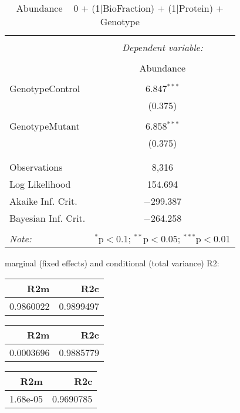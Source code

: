 \documentclass[11pt]{report}
\begin{document}
\begin{table}[!htbp] \centering 
  \caption{Abundance ~ 0 + (1|BioFraction) + (1|Protein) + Genotype} 
  \label{} 
\begin{tabular}{@{\extracolsep{5pt}}lc} 
\\[-1.8ex]\hline 
\hline \\[-1.8ex] 
 & \multicolumn{1}{c}{\textit{Dependent variable:}} \\ 
\cline{2-2} 
\\[-1.8ex] & Abundance \\ 
\hline \\[-1.8ex] 
 GenotypeControl & 6.847$^{***}$ \\ 
  & (0.375) \\ 
  & \\ 
 GenotypeMutant & 6.858$^{***}$ \\ 
  & (0.375) \\ 
  & \\ 
\hline \\[-1.8ex] 
Observations & 8,316 \\ 
Log Likelihood & 154.694 \\ 
Akaike Inf. Crit. & $-$299.387 \\ 
Bayesian Inf. Crit. & $-$264.258 \\ 
\hline 
\hline \\[-1.8ex] 
\textit{Note:}  & \multicolumn{1}{r}{$^{*}$p$<$0.1; $^{**}$p$<$0.05; $^{***}$p$<$0.01} \\ 
\end{tabular} 
\end{table} 
marginal (fixed effects) and conditional (total variance) R2:

\begin{tabular}{r|r}
\hline
R2m & R2c\\
\hline
0.9860022 & 0.9899497\\
\hline
\end{tabular}

\begin{tabular}{r|r}
\hline
R2m & R2c\\
\hline
0.0003696 & 0.9885779\\
\hline
\end{tabular}

\begin{tabular}{r|r}
\hline
R2m & R2c\\
\hline
1.68e-05 & 0.9690785\\
\hline
\end{tabular}
\end{document}
